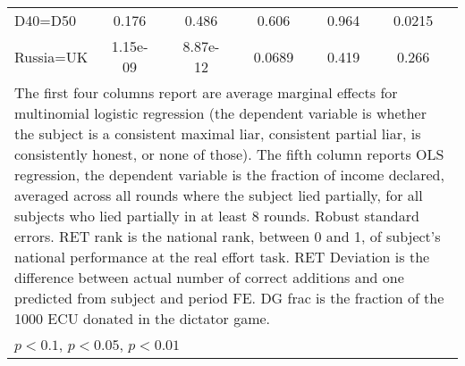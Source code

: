 \begin{tabular}{l|cccccccc|cc}
D40=D50         &    0.176         &         &    0.486         &         &    0.606         &         &    0.964         &         &   0.0215         &         \\
Russia=UK       & 1.15e-09         &         & 8.87e-12         &         &   0.0689         &         &    0.419         &         &    0.266         &         \\
\hline\hline
\multicolumn{11}{p{16.5cm}}{\tiny The first four columns report are average marginal effects for multinomial logistic regression (the dependent variable is whether the subject is a consistent maximal liar, consistent partial liar, is consistently honest, or none of those). The fifth column reports OLS regression, the dependent variable is the fraction of income declared, averaged across all rounds where the subject lied partially, for all subjects who lied partially in at least 8 rounds. Robust standard errors. RET rank is the national rank, between 0 and 1, of subject's national performance at the real effort task. RET Deviation is the difference between actual number of correct additions and one predicted from subject and period FE. DG frac is the fraction of the 1000 ECU donated in the dictator game.}\\
\multicolumn{11}{l}{\tiny \sym{*} \(p<0.1\), \sym{**} \(p<0.05\), \sym{***} \(p<0.01\)}\\
\end{tabular}